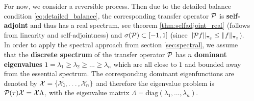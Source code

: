 For now, we consider a reversible process. Then due to the detailed balance condition \eqref{eq:detailed_balance}, the corresponding transfer operator $\mathcal{P}$ is \textbf{self-adjoint} and thus has a real spectrum, see theorem \ref{thm:selfadjoint_real} (follows from linearity and self-adjointness) and $\sigma(\mathcal{P}) \subset [-1,1]$ (since $\Vert \mathcal{P} f \Vert_{\pi_q} \leq \Vert f \Vert_{\pi_q}$).
In order to apply the spectral approach from section \ref{sec:spectral}, we assume that the \textbf{discrete spectrum} of the transfer operator $\mathcal{P}$ has $n$ \textbf{dominant eigenvalues}
$1 = \lambda_1 \geq \lambda_2 \geq \dots \geq \lambda_n$ which are all close to $1$ and bounded away from the essential spectrum.
The corresponding dominant eigenfunctions are denoted by $\mathcal{X} = \{ \mathcal{X}_1,\dots, \mathcal{X}_n\}$ and therefore the eigenvalue problem is $\mathcal{P} (\tau) \mathcal{X} = \mathcal{X} \Lambda$, with the eigenvalue matrix $\Lambda = \mathrm{diag}(\lambda_1, \dots, \lambda_n)$.
\\

